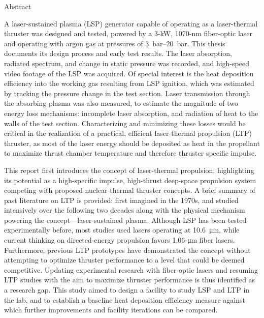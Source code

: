 \begin{plainchp}{Abstract}

    A laser-sustained plasma (LSP) generator capable of operating as a laser-thermal thruster was designed and tested, powered by a \num{3}-\unit{kW}, \num{1070}-\unit{nm} fiber-optic laser and operating with argon gas at pressures of \qtyrange{3}{20}{bar}. This thesis documents its design process and early test results. The laser absorption, radiated spectrum, and change in static pressure was recorded, and high-speed video footage of the LSP was acquired. Of special interest is the heat deposition efficiency into the working gas resulting from LSP ignition, which was estimated by tracking the pressure change in the test section. Laser transmission through the absorbing plasma was also measured, to estimate the magnitude of two energy loss mechanisms: incomplete laser absorption, and radiation of heat to the walls of the test section. Characterizing and minimizing these losses would be critical in the realization of a practical, efficient laser-thermal propulsion (LTP) thruster, as most of the laser energy should be deposited as heat in the propellant to maximize thrust chamber temperature and therefore thruster specific impulse.

    This report first introduces the concept of laser-thermal propulsion, highlighting its potential as a high-specific impulse, high-thrust deep-space pro\-pulsion system competing with proposed nuclear-thermal thruster concepts. A brief summary of past literature on LTP is provided: first imagined in the 1970s, and studied intensively over the following two decades along with the physical mechanism powering the concept---laser-sustained plasma. Although LSP has been tested experimentally before, most studies used  lasers operating at \qty{10.6}{\um}, while current thinking on directed-energy pro\-pulsion favors \num{1.06}-\unit{\um} fiber lasers. Furthermore, previous LTP prototypes have demonstrated the concept without attempting to optimize thruster performance to a level that could be deemed competitive. Updating experimental research with fiber-optic lasers and resuming LTP studies with the aim to maximize thruster performance is thus identified as a research gap. This study aimed to design a facility to study LSP and LTP in the lab, and to establish a baseline heat deposition efficiency measure against which further improvements and facility iterations can be compared.


\end{plainchp}
